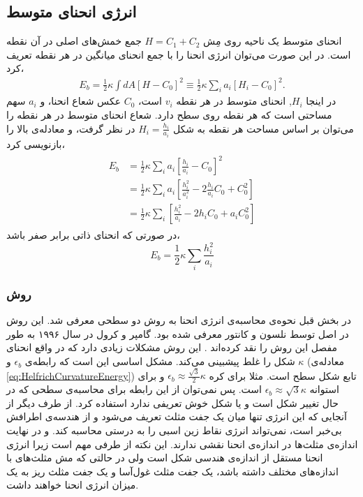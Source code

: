 


\subsection{
انرژی انحنای متوسط
}


انحنای متوسط یک ناحیه روی مِش 
$H=C_1+C_2$
جمع خمش‌های اصلی در آن نقطه است. در این صورت می‌توان انرژی انحنا را با جمع انحنای میانگین در هر نقطه تعریف کرد،
\begin{eqnarray}
E_{b}=\frac{1}{2}\kappa\int dA \left[H-C_0\right]^2\equiv\frac{1}{2}\kappa\sum_i a_i \left[H_i-C_0\right]^2.
\label{eq:bendingDiscretisation}
\end{eqnarray}
در اینجا 
$H_i$,
انحنای متوسط در هر نقطه  
$v_i$
است، 
$C_0$
عکس شعاع انحنا،  و 
$a_i$
سهم مساحتی است که هر نقطه روی سطح دارد. شعاع انحنای متوسط در هر نقطه را می‌توان بر اساس مساحت هر نقطه به شکل 
$H_i=\frac{h_i}{a_i}$
 در نظر گرفت، و معادله‌ی بالا را بازنویسی کرد،
\begin{eqnarray}
\begin{aligned}
E_{b}&=\frac{1}{2}\kappa\sum_i a_i \left[\frac{h_i}{a_i}-C_0\right]^2\\
&=\frac{1}{2}\kappa\sum_i a_i \left[\frac{h_i^2}{a_i^2}-2\frac{h_i}{a_i}C_0+C_0^2\right]\\
&=\frac{1}{2}\kappa\sum_i \left[\frac{h_i^2}{a_i}-2h_iC_0+a_iC_0^2\right]
\end{aligned}
\label{eq:bendingDiscretisationSpontaneous}
\end{eqnarray}
در صورتی که انحنای ذاتی برابر صفر باشد، 
\begin{equation}
E_{b}=\frac{1}{2}\kappa\sum_i \frac{h_i^2}{a_i}
\end{equation}


\subsubsection{
روش 
}
در بخش قبل نحوه‌ی محاسبه‌ی انرژی انحنا به روش دو سطحی
معرفی شد. این روش در اصل توسط نلسون و کانتور
\cite{NelsonPRL1987}
معرفی شده بود. گامپر و کرول در سال ۱۹۹۶ به طور مفصل این روش را نقد کرده‌اند
\cite{gompper1996}.
 این روش مشکلات زیادی دارد که در واقع انحنای شکل را غلط پیشبینی می‌کند. مشکل اساسی این است که رابطه‌ی 
$\epsilon_b$
و 
$\kappa$
(معادله‌ی  
\ref{eq:HelfrichCurvatureEnergy})
 تابع شکل سطح است.  مثلا برای کره
$\epsilon_b\approx\frac{\sqrt{3}}{2}\kappa$
و برای استوانه
$\epsilon_b\approx\sqrt{3}\kappa$
است. پس نمی‌توان از این رابطه برای محاسبه‌ی سطحی که در حال تغییر شکل است و یا شکل خوش تعریفی ندارد استفاده کرد. 
از طرف دیگر از آنجایی که این انرژی تنها میان یک جفت مثلث تعریف می‌شود و از هندسه‌ی اطرافش بی‌خبر است، نمی‌تواند انرژی نقاط زین اسبی را به درستی محاسبه کند. و در نهایت اندازه‌ی مثلث‌ها در اندازه‌ی انحنا نقشی ندارند. این نکته از طرفی مهم است زیرا انرژی انحنا مستقل از اندازه‌ی هندسی شکل است ولی در حالتی که مش مثلث‌های با اندازه‌های مختلف داشته باشد، یک جفت مثلث غول‌آسا و یک جفت مثلث ریز به یک میزان انرژی انحنا خواهند داشت.

